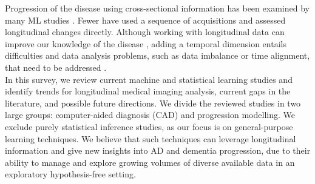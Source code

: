 
Progression of the disease using cross-sectional information has been examined by many ML studies \cite{Oxtoby2017,Acharya2019}. Fewer have used a sequence of acquisitions and assessed longitudinal changes directly. Although working with longitudinal data can improve our knowledge of the disease \cite{Xu2014}, adding a temporal dimension entails difficulties and data analysis problems, such as data imbalance or time alignment, that need to be addressed \cite{Fitzmaurice2008,Ibrahim}. \\

In this survey, we review current machine and statistical learning studies and identify trends for longitudinal medical imaging analysis, current gaps in the literature, and possible future directions. We divide the reviewed studies in two large groups: computer-aided diagnosis (CAD) and progression modelling. We exclude purely statistical inference studies, as our focus is on general-purpose learning techniques. We believe that such techniques can leverage longitudinal information and give new insights into AD and dementia progression, due to their ability to manage and explore growing volumes of diverse available data in an exploratory hypothesis-free setting.\\


